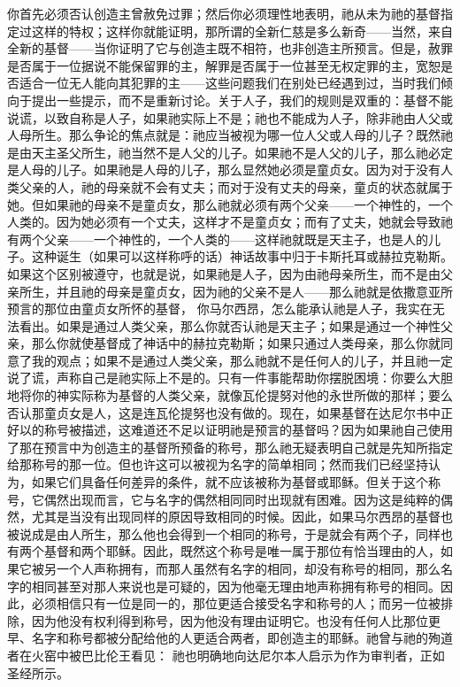 你首先必须否认创造主曾赦免过罪；然后你必须理性地表明，祂从未为祂的基督指定过这样的特权；这样你就能证明，那所谓的全新仁慈是多么新奇——当然，来自全新的基督——当你证明了它与创造主既不相符，也非创造主所预言。但是，赦罪是否属于一位据说不能保留罪的主，解罪是否属于一位甚至无权定罪的主，宽恕是否适合一位无人能向其犯罪的主——这些问题我们在别处已经遇到过，当时我们倾向于提出一些提示，而不是重新讨论。关于人子，我们的规则是双重的：基督不能说谎，以致自称是人子，如果祂实际上不是；祂也不能成为人子，除非祂由人父或人母所生。那么争论的焦点就是：祂应当被视为哪一位人父或人母的儿子？既然祂是由天主圣父所生，祂当然不是人父的儿子。如果祂不是人父的儿子，那么祂必定是人母的儿子。如果祂是人母的儿子，那么显然她必须是童贞女。因为对于没有人类父亲的人，祂的母亲就不会有丈夫；而对于没有丈夫的母亲，童贞的状态就属于她。但如果祂的母亲不是童贞女，那么祂就必须有两个父亲——一个神性的，一个人类的。因为她必须有一个丈夫，这样才不是童贞女；而有了丈夫，她就会导致祂有两个父亲——一个神性的，一个人类的——这样祂就既是天主子，也是人的儿子。这种诞生（如果可以这样称呼的话）神话故事中归于卡斯托耳或赫拉克勒斯。如果这个区别被遵守，也就是说，如果祂是人子，因为由祂母亲所生，而不是由父亲所生，并且祂的母亲是童贞女，因为祂的父亲不是人——那么祂就是依撒意亚所预言的那位由童贞女所怀的基督，\newline{} 你马尔西昂，怎么能承认祂是人子，我实在无法看出。如果是通过人类父亲，那么你就否认祂是天主子；如果是通过一个神性父亲，那么你就使基督成了神话中的赫拉克勒斯；如果只通过人类母亲，那么你就同意了我的观点；如果不是通过人类父亲，那么祂就不是任何人的儿子，并且祂一定说了谎，声称自己是祂实际上不是的。只有一件事能帮助你摆脱困境：你要么大胆地将你的神实际称为基督的人类父亲，就像瓦伦提努对他的永世所做的那样；要么否认那童贞女是人，这是连瓦伦提努也没有做的。现在，如果基督在达尼尔书中正好以的称号被描述，这难道还不足以证明祂是预言的基督吗？因为如果祂自己使用了那在预言中为创造主的基督所预备的称号，那么祂无疑表明自己就是先知所指定给那称号的那一位。但也许这可以被视为名字的简单相同；然而我们已经坚持认为，如果它们具备任何差异的条件，就不应该被称为基督或耶稣。但关于这个称号，它偶然出现而言，它与名字的偶然相同同时出现就有困难。因为这是纯粹的偶然，尤其是当没有出现同样的原因导致相同的时候。因此，如果马尔西昂的基督也被说成是由人所生，那么他也会得到一个相同的称号，于是就会有两个子，同样也有两个基督和两个耶稣。因此，既然这个称号是唯一属于那位有恰当理由的人，如果它被另一个人声称拥有，而那人虽然有名字的相同，却没有称号的相同，那么名字的相同甚至对那人来说也是可疑的，因为他毫无理由地声称拥有称号的相同。因此，必须相信只有一位是同一的，那位更适合接受名字和称号的人；而另一位被排除，因为他没有权利得到称号，因为他没有理由证明它。也没有任何人比那位更早、名字和称号都被分配给他的人更适合两者，即创造主的耶稣。祂曾与祂的殉道者在火窑中被巴比伦王看见：\newline{} 祂也明确地向达尼尔本人启示为作为审判者，正如圣经所示。\newline{} 